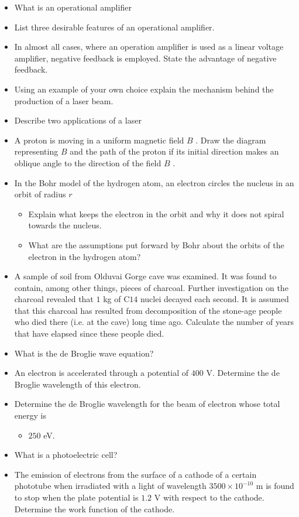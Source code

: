 \documentclass{article}
\begin{document}
\begin{itemize}
\item What is an operational amplifier 
\item List three desirable features of an operational amplifier.
\item In almost all cases, where an operation amplifier is used as a linear voltage amplifier, negative feedback is employed. State the advantage of negative feedback.
\item Using an example of your own choice explain the mechanism behind the production of a laser beam.
\item Describe two applications of a laser
\item A proton is moving in a uniform magnetic field $ B$ . Draw the diagram representing $ B$ and the path of the proton if its initial direction makes an oblique angle to the direction of the field $ B$ . 
\item In the Bohr model of the hydrogen atom, an electron circles the nucleus in an orbit of radius $ r$
 \begin{itemize}
\item Explain what keeps the electron in the orbit and why it does not spiral towards the nucleus.
\item What are the assumptions put forward by Bohr about the orbits of the electron in the hydrogen atom?
\end{itemize}
\item A sample of soil from Olduvai Gorge cave was examined. It was found to contain, among other things, pieces of charcoal. Further investigation on the charcoal revealed that $ 1$ kg of C$ 14$ nuclei decayed each second. It is assumed that this charcoal has resulted from decomposition of the stone-age people who died there (i.e. at the cave) long time ago. Calculate the number of years that have elapsed since these people died.
\item What is the de Broglie wave equation?
\item An electron is accelerated through a potential of $ 400$ V. Determine the de Broglie wavelength of this electron.
\item Determine the de Broglie wavelength for the beam of electron whose total energy is
 \begin{itemize}
\item $ 250$ eV.
\end{itemize}
\item What is a photoelectric cell?
\item The emission of electrons from the surface of a cathode of a certain phototube when irradiated with a light of wavelength $ 3500 \times 10^{-10}$ m is found to stop when the plate potential is $ 1.2$ V with respect to the cathode. Determine the work function of the cathode.
\end{itemize}
\end{document}
